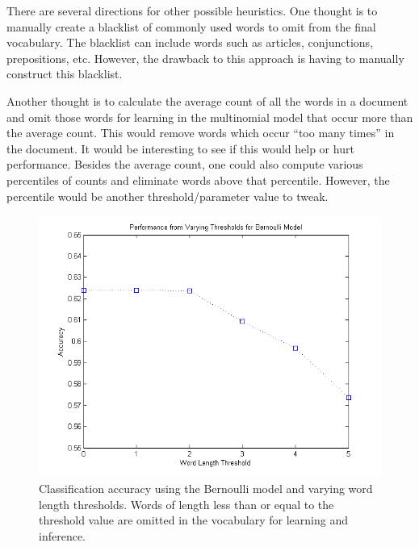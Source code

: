 \documentclass[12pt]{article}
\begin{document}
There are several directions for other possible heuristics. One thought is to manually create a blacklist of commonly used words to omit from the final vocabulary. The blacklist can include words such as articles, conjunctions, prepositions, etc. However, the drawback to this approach is having to manually construct this blacklist.

Another thought is to calculate the average count of all the words in a document and omit those words for learning in the multinomial model that occur more than the average count. This would remove words which occur ``too many times'' in the document. It would be interesting to see if this would help or hurt performance. Besides the average count, one could also compute various percentiles of counts and eliminate words above that percentile. However, the percentile would be another threshold/parameter value to tweak.

\begin{figure}[!t]
  \centering
  \includegraphics[scale=.50]{img/vocabthreshold_bern.png}
  \caption{Classification accuracy using the Bernoulli model and varying word length thresholds. Words of length less than or equal to the threshold value are omitted in the vocabulary for learning and inference.}
  \label{fig:vocabthreshold_bern}
\end{figure}
\end{document}
